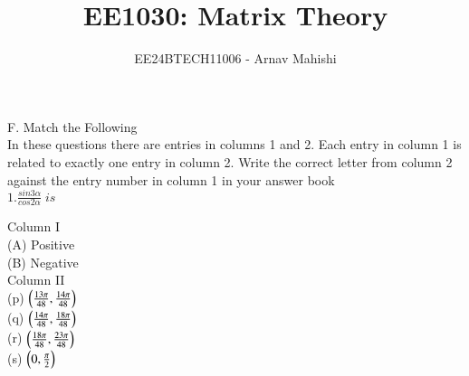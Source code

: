 \documentclass[journal,12pt,twocolumn]{IEEEtran}
\theoremstyle{remark}
\begin{document}

\vspace{3cm}

\title{EE1030: Matrix Theory}
\author{EE24BTECH11006 - Arnav Mahishi}
\maketitle
\newpage
\bigskip

\renewcommand{\thefigure}{\theenumi}
\renewcommand{\thetable}{\theenumi}
F. Match the Following \\
In these questions there are entries in columns 1 and 2. Each entry in column 1 is related to exactly one entry in column 2. Write the correct letter from column 2 against the entry number in column 1 in your answer book
\\
$1. \frac{sin3\alpha}{cos2\alpha} \; is $\hfill{}
\\
\begin{multicols}{2}
Column I
\\
(A) Positive
\\
(B) Negative
\columnbreak
\\
Column II
\\
(p) $\left(\frac{13\pi}{48},\frac{14\pi}{48}\right)$
\\
(q) $\left(\frac{14\pi}{48},\frac{18\pi}{48}\right)$
\\
(r) $\left(\frac{18\pi}{48},\frac{23\pi}{48}\right)$
\\
(s) $\left(0,\frac{\pi}{2}\right)$


\end{multicols}
\end{document}
